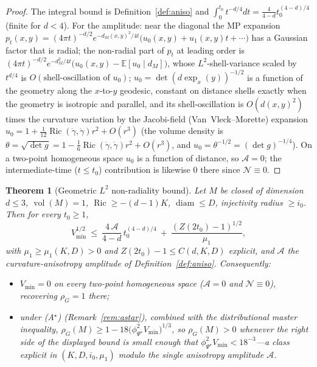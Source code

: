 \documentclass[11pt]{article}
\newtheorem{theorem}{Theorem}
\theoremstyle{remark}
\newcommand{\vol}{\operatorname{vol}}
\newcommand{\diam}{\operatorname{diam}}
\newcommand{\dM}{d_M}
\newcommand{\rhoG}{\rho_G}
\newcommand{\E}{\mathbb E}
\DeclareMathOperator{\Ric}{Ric}
\begin{document}
\begin{proof}
The integral bound is Definition~\ref{def:aniso} and $\int_0^{t_0}t^{-d/4}dt=\frac{4}{4-d}
t_0^{(4-d)/4}$ (finite for $d<4$). For the amplitude: near the diagonal the MP expansion
$p_t(x,y)=(4\pi t)^{-d/2}e^{-\dM(x,y)^2/4t}\bigl(u_0(x,y)+u_1(x,y)t+\cdots\bigr)$ has a
Gaussian factor that is radial; the non-radial part of $p_t$ at leading order is
$(4\pi t)^{-d/2}e^{-\dM^2/4t}\bigl(u_0(x,y)-\E[u_0\mid\dM]\bigr)$, whose $L^2$-shell-variance
scaled by $t^{d/4}$ is $O(\text{shell-oscillation of }u_0)$; $u_0=\det(d\exp_x(y))^{-1/2}$ is
a function of the geometry along the $x$-to-$y$ geodesic, constant on distance shells exactly
when the geometry is isotropic and parallel, and its shell-oscillation is $O(d(x,y)^2)$ times
the curvature variation by the Jacobi-field (Van~Vleck--Morette) expansion
$u_0=1+\tfrac1{12}\Ric(\dot\gamma,\dot\gamma)r^2+O(r^3)$ (the volume density is
$\theta=\sqrt{\det g}=1-\tfrac16\Ric(\dot\gamma,\dot\gamma)r^2+O(r^3)$, and
$u_0=\theta^{-1/2}=(\det g)^{-1/4}$).
On a two-point homogeneous space $u_0$ is a function of distance, so $\mathcal A=0$; the
intermediate-time ($t\le t_0$) contribution is likewise $0$ there since $\mathcal N\equiv0$.
\end{proof}

\begin{theorem}[Geometric $L^2$ non-radiality bound]\label{thm:main}
Let $M$ be closed of dimension $d\le3$, $\vol(M)=1$, $\Ric\ge-(d-1)K$, $\diam\le D$,
injectivity radius $\ge i_0$. Then for every $t_0\ge1$,
\[
V_{\min}^{1/2}\ \le\ \frac{4\,\mathcal A}{4-d}\,t_0^{(4-d)/4}\ +\ \frac{(Z(2t_0)-1)^{1/2}}{\mu_1},
\]
with $\mu_1\ge\mu_1(K,D)>0$ and $Z(2t_0)-1\le C(d,K,D)$ explicit, and $\mathcal A$ the
curvature-anisotropy amplitude of Definition~\ref{def:aniso}. Consequently:
\begin{itemize}
\item[(i)] $V_{\min}=0$ on every two-point homogeneous space ($\mathcal A=0$ and
$\mathcal N\equiv0$), recovering $\rhoG=1$ there;
\item[(ii)] under \textup{(A$^\star$)} (Remark~\ref{rem:astar}), combined with the
distributional master inequality, $\rhoG(M)\ge1-18\bigl(\phi_{\Psi^\star}^2V_{\min}\bigr)^{1/3}$,
so $\rhoG(M)>0$ whenever the right side of the displayed bound is small enough that
$\phi_{\Psi^\star}^2V_{\min}<18^{-3}$---a class explicit in $(K,D,i_0,\mu_1)$ modulo the single
anisotropy amplitude $\mathcal A$.
\end{itemize}
\end{theorem}
\end{document}
